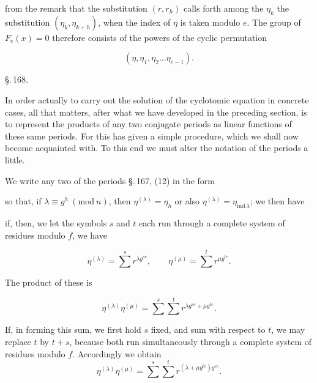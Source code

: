 from the remark that the substitution $(r, r_h)$ calls forth among the $\eta_k$
the substitution $(\eta_k, \eta_{k+h})$, when the index of $\eta$
is taken modulo $e$. The group of $F_e(x) = 0$
therefore consists of the powers of the cyclic permutation

\[
(\eta, \eta_1, \eta_2 \ldots \eta_{e-1}).
\]

\begin{center}
\S.\,168.

\end{center}

In order actually to carry out the solution of the cyclotomic
equation in concrete cases, all that matters, after what we
have developed in the preceding section, is to represent the
products of any two conjugate periods as linear functions
of these same periods. For this  has given a simple
procedure, which we shall now become acquainted with. To this
end we must alter the notation of the periods a little.

We write any two of the periods \S.\,167, (12) in
the form


so that, if $\lambda \equiv g^h \ (\mathrm{mod}\ n)$, then $\eta^{(\lambda)} = \eta_h$ or also
$\eta^{(\lambda)} = \eta_{\mathrm{ind}\,\lambda}$; we then have


if, then, we let the symbols $s$ and $t$ each run through a complete system of residues
modulo $f$, we have

\[
\eta^{(\lambda)} = \sum^{s} r^{\lambda g^{se}}, \qquad \eta^{(\mu)} = \sum^{t} r^{\mu g^{te}}.
\]

The product of these is

\[
\eta^{(\lambda)} \eta^{(\mu)} = \sum^{s}\sum^{t} r^{\lambda g^{se} + \mu g^{te}}.
\]

If, in forming this sum, we first hold $s$ fixed,
and sum with respect to $t$, we may replace $t$ by $t + s$, because both run simultaneously through a complete system of residues
modulo $f$. Accordingly we obtain
\[
\eta^{(\lambda)}\eta^{(\mu)} = \sum^{s}\sum^{t} r^{(\lambda + \mu g^{te})g^{se}}.
\]
